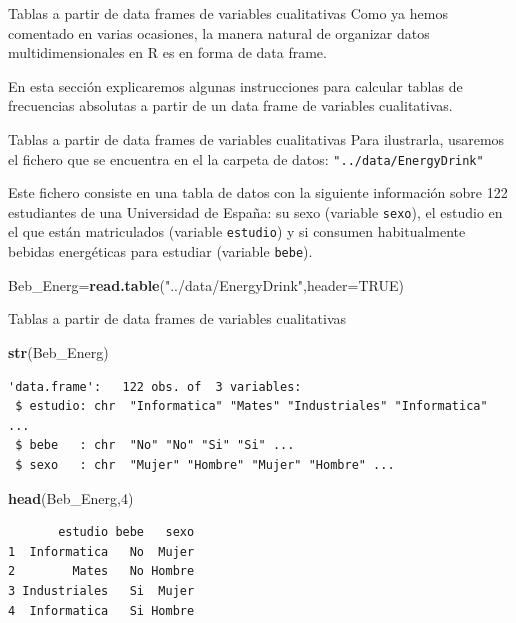 \documentclass[
  ignorenonframetext,
  aspectratio=169]{beamer}
\newenvironment{Shaded}{\begin{snugshade}}{\end{snugshade}}
\newcommand{\AttributeTok}[1]{\textcolor[rgb]{0.13,0.29,0.53}{#1}}
\newcommand{\ConstantTok}[1]{\textcolor[rgb]{0.56,0.35,0.01}{#1}}
\newcommand{\DecValTok}[1]{\textcolor[rgb]{0.00,0.00,0.81}{#1}}
\newcommand{\FunctionTok}[1]{\textcolor[rgb]{0.13,0.29,0.53}{\textbf{#1}}}
\newcommand{\NormalTok}[1]{#1}
\newcommand{\OtherTok}[1]{\textcolor[rgb]{0.56,0.35,0.01}{#1}}
\newcommand{\StringTok}[1]{\textcolor[rgb]{0.31,0.60,0.02}{#1}}
\begin{document}
\begin{frame}{Tablas a partir de data frames de variables cualitativas}
\label{tablas-a-partir-de-data-frames-de-variables-cualitativas}
Como ya hemos comentado en varias ocasiones, la manera natural de
organizar datos multidimensionales en R es en forma de data frame.

En esta sección explicaremos algunas instrucciones para calcular tablas
de frecuencias absolutas a partir de un data frame de variables
cualitativas.
\end{frame}

\begin{frame}[fragile]{Tablas a partir de data frames de variables
cualitativas}
\label{tablas-a-partir-de-data-frames-de-variables-cualitativas-1}
Para ilustrarla, usaremos el fichero que se encuentra en el la carpeta
de datos: \texttt{"../data/EnergyDrink"}

Este fichero consiste en una tabla de datos con la siguiente información
sobre 122 estudiantes de una Universidad de España: su sexo (variable
\texttt{sexo}), el estudio en el que están matriculados (variable
\texttt{estudio}) y si consumen habitualmente bebidas energéticas para
estudiar (variable \texttt{bebe}).

\begin{Shaded}
\begin{Highlighting}[]
\NormalTok{Beb\_Energ}\OtherTok{=}\FunctionTok{read.table}\NormalTok{(}\StringTok{"../data/EnergyDrink"}\NormalTok{,}\AttributeTok{header=}\ConstantTok{TRUE}\NormalTok{)}
\end{Highlighting}
\end{Shaded}
\end{frame}

\begin{frame}[fragile]{Tablas a partir de data frames de variables
cualitativas}
\label{tablas-a-partir-de-data-frames-de-variables-cualitativas-2}
\begin{Shaded}
\begin{Highlighting}[]
\FunctionTok{str}\NormalTok{(Beb\_Energ)}
\end{Highlighting}
\end{Shaded}

\begin{verbatim}
'data.frame':   122 obs. of  3 variables:
 $ estudio: chr  "Informatica" "Mates" "Industriales" "Informatica" ...
 $ bebe   : chr  "No" "No" "Si" "Si" ...
 $ sexo   : chr  "Mujer" "Hombre" "Mujer" "Hombre" ...
\end{verbatim}

\begin{Shaded}
\begin{Highlighting}[]
\FunctionTok{head}\NormalTok{(Beb\_Energ,}\DecValTok{4}\NormalTok{)}
\end{Highlighting}
\end{Shaded}

\begin{verbatim}
       estudio bebe   sexo
1  Informatica   No  Mujer
2        Mates   No Hombre
3 Industriales   Si  Mujer
4  Informatica   Si Hombre
\end{verbatim}
\end{frame}
\end{document}
